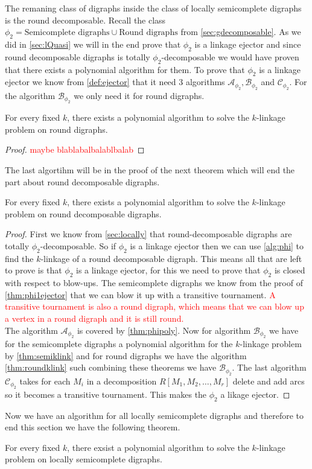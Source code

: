 The remaning class of digraphs inside the class of locally semicomplete digraphs is the round decomposable. 
Recall the class $\phi_2=\text{Semicomplete digraphs}\cup\text{Round digraphs}$ from \autoref{sec:gdecomposable}.
As we did in \autoref{sec:lQuasi} we will in the end prove that $\phi_2$ is a linkage ejector and since round decomposable digraphs is totally $\phi_2$-decomposable we would have proven that there exists a polynomial algorithm for them.
To prove that $\phi_2$ is a linkage ejector we know from \autoref{def:ejector} that it need 3 algorithms $\mathcal{A}_{\phi_2},\mathcal{B}_{\phi_2}$ and $\mathcal{C}_{\phi_2}$. For the algorithm $\mathcal{B}_{\phi_2}$ we only need it for round digraphs.
\begin{thm}
    For every fixed $k$, there exists a polynomial algorithm to solve the $k$-linkage problem on round digraphs.
    \label{thm:roundklink}
\end{thm}
\begin{proof}
    \textcolor{red}{maybe blablabalbalablbalab}
\end{proof}
The last algortihm will be in the proof of the next theorem which will end the part about round decomposable digraphs.
\begin{thm}
    For every fixed $k$, there exists a polynomial algorithm to solve the $k$-linkage problem on round decomposable digraphs.
\end{thm}
\begin{proof}
    First we know from \autoref{sec:locally} that round-decomposable digraphs are totally $\phi_2$-decomposable. So if $\phi_2$ is a linkage ejector then we can use \autoref{alg:phi} to find the $k$-linkage of a round decomposable digraph. This means all that are left to prove is that $\phi_2$ is a linkage ejector, for this we need to prove that $\phi_2$ is closed with respect to blow-ups.
    The semicomplete digraphs we know from the proof of \autoref{thm:phi1ejector} that we can blow it up with a transitive tournament. 
    \textcolor{red}{A transitive tournament is also a round digraph, which means that we can blow up a vertex in a round digraph and it is still round.}\\
    The algorithm $\mathcal{A}_{\phi_2}$ is covered by \autoref{thm:phipoly}.
    Now for algorithm $\mathcal{B}_{\phi_2}$ we have for the semicomplete digraphs a polynomial algorithm for the $k$-linkage problem by \autoref{thm:semiklink} and for round digraphs we have the algorithm \autoref{thm:roundklink} such combining these theorems we have $\mathcal{B}_{\phi_2}$. The last algorithm $\mathcal{C}_{\phi_2}$ takes for each $M_i$ in a decomposition $R[M_1,M_2,\dots , M_r]$ delete and add arcs so it becomes a transitive tournament. 
    This makes the $\phi_2$ a likage ejector.
\end{proof}
Now we have an algorithm for all locally semicomplete digraphs and therefore to end this section we have the following theorem.
\begin{thm}
    For every fixed $k$, there exsist a polynomial algorithm to solve the $k$-linkage problem on locally semicomplete digraphs.
\end{thm}
